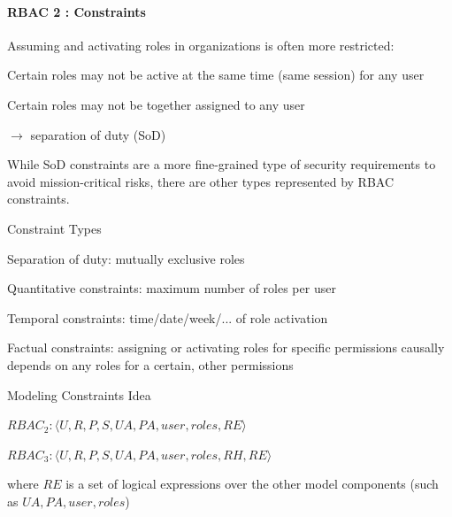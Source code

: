 \documentclass[a4paper]{article}
\begin{document}
\begin{multicols}{3}
    \paragraph{RBAC 2 : Constraints}
    Assuming and activating roles in organizations is often more restricted:
    \begin{itemize*}
        \item Certain roles may not be active at the same time (same session) for any user
        \item Certain roles may not be together assigned to any user
        \item[$\rightarrow$] separation of duty (SoD)
        \item While SoD constraints are a more fine-grained type of security requirements to avoid mission-critical risks, there are other types represented by RBAC constraints.
    \end{itemize*}
    Constraint Types
    \begin{itemize*}
        \item Separation of duty: mutually exclusive roles
        \item Quantitative constraints: maximum number of roles per user
        \item Temporal constraints: time/date/week/... of role activation
        \item Factual constraints: assigning or activating roles for specific permissions causally depends on any roles for a certain, other permissions
    \end{itemize*}
    Modeling Constraints Idea
    \begin{itemize*}
        \item $RBAC_2: \langle U,R,P,S,UA,PA,user,roles,RE\rangle$
        \item $RBAC_3: \langle U,R,P,S,UA,PA,user,roles,RH,RE\rangle$
        \item where $RE$ is a set of logical expressions over the other model components (such as $UA,PA,user,roles$)
    \end{itemize*}


\end{multicols}
\end{document}
